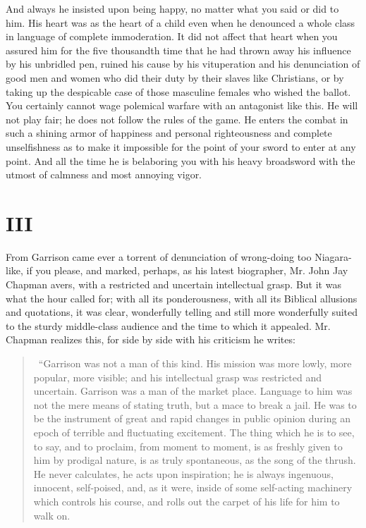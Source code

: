 \documentclass{book}
\begin{document}
And always he insisted upon being happy, no matter what you said or did to him. His heart was as the heart of a child even when he denounced a whole class in language of complete immoderation. It did not affect that heart when you assured him for the five thousandth time that he had thrown away his influence by his unbridled pen, ruined his cause by his vituperation and his denunciation of good men and women who did their duty by their slaves like Christians, or by taking up the despicable case of those masculine females who wished the ballot. You certainly cannot wage polemical warfare with an antagonist like this. He will not play fair; he does not follow the rules of the game. He enters the combat in such a shining armor of happiness and personal righteousness and complete unselfishness as to make it impossible for the point of your sword to enter at any point. And all the time he is belaboring you with his heavy broadsword with the utmost of calmness and most annoying vigor.

\section{III}
From Garrison came ever a torrent of denunciation of wrong-doing too Niagara-like, if you please, and marked, perhaps, as his latest biographer, Mr. John Jay Chapman avers, with a restricted and uncertain intellectual grasp. But it was what the hour called for; with all its ponderousness, with all its Biblical allusions and quotations, it was clear, wonderfully telling and still more wonderfully suited to the sturdy middle-class audience and the time to which it appealed. Mr. Chapman realizes this, for side by side with his criticism he writes:

\begin{quotation}\
	“Garrison was not a man of this kind. His mission was more lowly, more popular, more visible; and his intellectual grasp was restricted and uncertain. Garrison was a man of the market place. Language to him was not the mere means of stating truth, but a mace to break a jail. He was to be the instrument of great and rapid changes in public opinion during an epoch of terrible and fluctuating excitement. The thing which he is to see, to say, and to proclaim, from moment to moment, is as freshly given to him by prodigal nature, is as truly spontaneous, as the song of the thrush. He never calculates, he acts upon inspiration; he is always ingenuous, innocent, self-poised, and, as it were, inside of some self-acting machinery which controls his course, and rolls out the carpet of his life for him to walk on.
\end{quotation}
\end{document}
